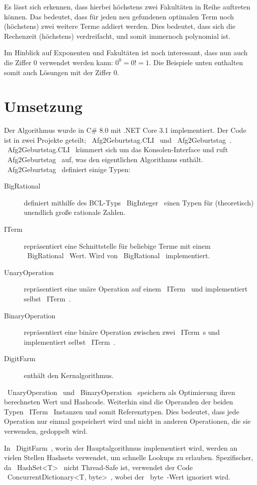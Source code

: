 \documentclass{article}
\theoremstyle{nonumberplain}
\begin{document}
Es lässt sich erkennen, dass hierbei höchstens zwei Fakultäten in Reihe auftreten können.
Das bedeutet, dass für jeden neu gefundenen optimalen Term noch (höchstens) zwei weitere Terme addiert werden.
Dies bedeutet, dass sich die Rechenzeit (höchstens) verdreifacht, und somit immernoch polynomial ist.

Im Hinblick auf Exponenten und Fakultäten ist noch interessant, dass nun auch die Ziffer \(0\) verwendet werden kann:
\(0^0 = 0! = 1\).
Die Beispiele unten enthalten somit auch Lösungen mit der Ziffer \(0\).

\section{Umsetzung}

Der Algorithmus wurde in C\# 8.0 mit .NET Core 3.1 implementiert.
Der Code ist in zwei Projekte geteilt;
~Afg2Geburtstag.CLI~ und ~Afg2Geburtstag~.
~Afg2Geburtstag.CLI~ kümmert sich um das Konsolen-Interface und ruft ~Afg2Geburtstag~ auf, was den eigentlichen Algorithmus enthält.
~Afg2Geburtstag~ definiert einige Typen:

\begin{description}
    \item[BigRational] definiert mithilfe des BCL-Typs ~BigInteger~ einen Typen für (theoretisch) unendlich große rationale Zahlen.
    \item[ITerm] repräsentiert eine Schnittstelle für beliebige Terme mit einem ~BigRational~ Wert. Wird von ~BigRational~ implementiert.
    \item[UnaryOperation] repräsentiert eine unäre Operation auf einem ~ITerm~ und implementiert selbst ~ITerm~.
    \item[BinaryOperation] repräsentiert eine binäre Operation zwischen zwei ~ITerm~s und implementiert selbst ~ITerm~.
    \item[DigitFarm] enthält den Kernalgorithmus.
\end{description}

~UnaryOperation~ und ~BinaryOperation~ speichern als Optimierung ihren berechneten Wert und Hashcode.
Weiterhin sind die Operanden der beiden Typen ~ITerm~ Instanzen und somit Referenztypen.
Dies bedeutet, dass jede Operation nur einmal gespeichert wird und nicht in anderen Operationen, die sie verwenden, gedoppelt wird.

In ~DigitFarm~, worin der Hauptalgorithmus implementiert wird, werden an vielen Stellen Hashsets verwendet, um schnelle Lookups zu erlauben.
Spezifischer, da ~HashSet<T>~ nicht Thread-Safe ist, verwendet der Code ~ConcurrentDictionary<T, byte>~, wobei der ~byte~-Wert ignoriert wird.
\end{document}
